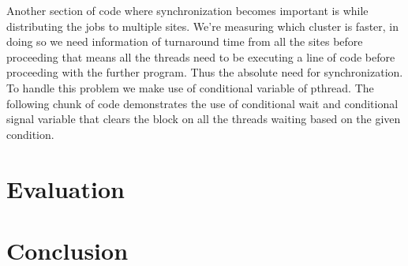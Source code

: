 \documentclass[ms,electronic,double]{nuthesis}
\begin{document}
Another section of code where synchronization becomes important is while 
distributing the jobs to multiple sites. We're measuring which cluster is 
faster, in doing so we need information of turnaround time from all the sites 
before proceeding that means all the threads need to be executing a line of code 
before proceeding with the further program. Thus the absolute need for 
synchronization. To handle this problem we make use of conditional variable of 
pthread. The following chunk of code demonstrates the use of conditional wait 
and conditional signal variable that clears the block on all the threads waiting 
based on the given condition.

\chapter{Evaluation}

\chapter{Conclusion}


\backmatter

\appendix




\nocite{*}

\end{document}
